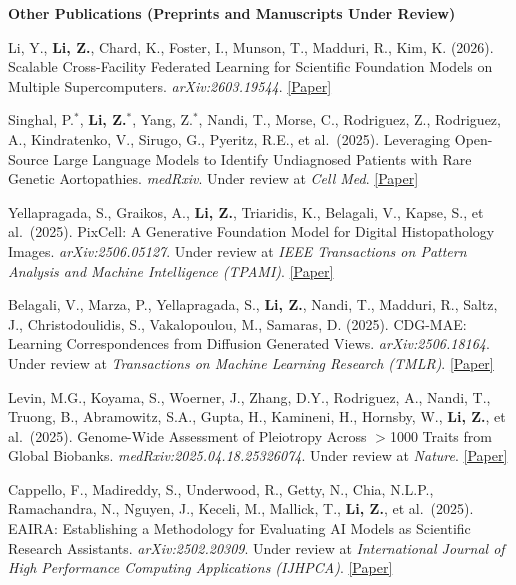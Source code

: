 \documentclass[letterpaper,11pt]{article}
\newcommand{\PubSection}[1]{%
  \vspace{6pt}\noindent\textbf{#1}\vspace{3pt}%
}
\begin{document}
\PubSection{Other Publications (Preprints and Manuscripts Under Review)}
\begin{enumerate}[leftmargin=1cm, label={[\arabic*]}, itemsep=3pt]
  \small
  \item Li, Y., \textbf{Li, Z.}, Chard, K., Foster, I., Munson, T., Madduri, R., Kim, K. (2026). Scalable Cross-Facility Federated Learning for Scientific Foundation Models on Multiple Supercomputers. \textit{arXiv:2603.19544}. \href{https://arxiv.org/abs/2603.19544}{[Paper]}

  \item Singhal, P.$^*$, \textbf{Li, Z.$^*$}, Yang, Z.$^*$, Nandi, T., Morse, C., Rodriguez, Z., Rodriguez, A., Kindratenko, V., Sirugo, G., Pyeritz, R.E., et al.\ (2025). Leveraging Open-Source Large Language Models to Identify Undiagnosed Patients with Rare Genetic Aortopathies. \textit{medRxiv}. Under review at \textit{Cell Med}. \href{https://www.medrxiv.org/content/10.1101/2025.09.05.25333227v2}{[Paper]}
  
  \item Yellapragada, S., Graikos, A., \textbf{Li, Z.}, Triaridis, K., Belagali, V., Kapse, S., et al.\ (2025). PixCell: A Generative Foundation Model for Digital Histopathology Images. \textit{arXiv:2506.05127}. Under review at \textit{IEEE Transactions on Pattern Analysis and Machine Intelligence (TPAMI)}. \href{https://arxiv.org/abs/2506.05127}{[Paper]}

  \item Belagali, V., Marza, P., Yellapragada, S., \textbf{Li, Z.}, Nandi, T., Madduri, R., Saltz, J., Christodoulidis, S., Vakalopoulou, M., Samaras, D. (2025). CDG-MAE: Learning Correspondences from Diffusion Generated Views. \textit{arXiv:2506.18164}. Under review at \textit{Transactions on Machine Learning Research (TMLR)}. \href{https://arxiv.org/abs/2506.18164}{[Paper]}

  \item Levin, M.G., Koyama, S., Woerner, J., Zhang, D.Y., Rodriguez, A., Nandi, T., Truong, B., Abramowitz, S.A., Gupta, H., Kamineni, H., Hornsby, W., \textbf{Li, Z.}, et al.\ (2025). Genome-Wide Assessment of Pleiotropy Across $>$1000 Traits from Global Biobanks. \textit{medRxiv:2025.04.18.25326074}. Under review at \textit{Nature}. \href{https://www.medrxiv.org/content/10.1101/2025.04.18.25326074v2}{[Paper]}

  \item Cappello, F., Madireddy, S., Underwood, R., Getty, N., Chia, N.L.P., Ramachandra, N., Nguyen, J., Keceli, M., Mallick, T., \textbf{Li, Z.}, et al.\ (2025). EAIRA: Establishing a Methodology for Evaluating AI Models as Scientific Research Assistants. \textit{arXiv:2502.20309}. Under review at \textit{International Journal of High Performance Computing Applications (IJHPCA)}. \href{https://arxiv.org/abs/2502.20309}{[Paper]}
\end{enumerate}
\end{document}
